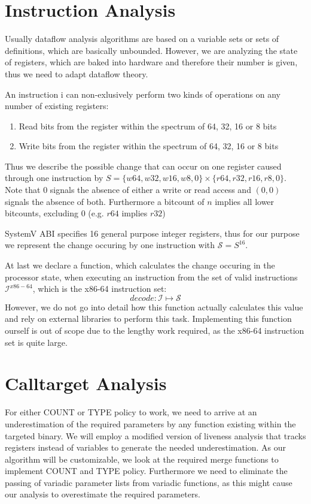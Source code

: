 \section{Instruction Analysis}
\label{section:instructionanalysis}
Usually dataflow analysis algorithms are based on a variable sets or sets of definitions, which are basically unbounded. However, we are analyzing the state of registers, which are baked into hardware and therefore their number is given, thus we need to adapt dataflow theory.

An instruction i can non-exlusively perform two kinds of operations on any number of existing registers:
\begin{enumerate}
\item Read bits from the register within the spectrum of 64, 32, 16 or 8 bits
\item Write bits from the register within the spectrum of 64, 32, 16 or 8 bits
\end{enumerate}
Thus we describe the possible change that can occur on one register caused through one instruction by $S = \{ w64, w32, w16, w8, 0 \} \times \{r64, r32, r16, r8, 0 \}$. Note that 0 signals the absence of either a write or read access and $(0, 0)$ signals the absence of both. Furthermore a bitcount of $n$ implies all lower bitcounts, excluding 0 (e.g. $r64$ implies $r32$)

SystemV ABI specifies 16 general purpose integer registers, thus for our purpose we represent the change occuring by one instruction with $\mathcal{S} = S^{16}$.

At last we declare a function, which calculates the change occuring in the processor state, when executing an instruction from the set of valid instructions $\mathcal{I}^{x86-64}$, which is the x86-64 instruction set:
\[
decode : \mathcal{I} \mapsto \mathcal{S}
\]
However, we do not go into detail how this function actually calculates this value and rely on external libraries to perform this task. Implementing this function ourself is out of scope due to the lengthy work required, as the x86-64 instruction set is quite large.

\section{Calltarget Analysis}
\label{section:calltargetanalysis}
For either COUNT or TYPE policy to work, we need to arrive at an underestimation of the required parameters by any function existing within the targeted binary. We will employ a modified version of liveness analysis that tracks registers instead of variables to generate the needed underestimation. As our algorithm will be customizable, we look at the required merge functions to implement COUNT and TYPE policy. Furthermore we need to eliminate the passing of variadic parameter lists from variadic functions, as this might cause our analysis to overestimate the required parameters.

